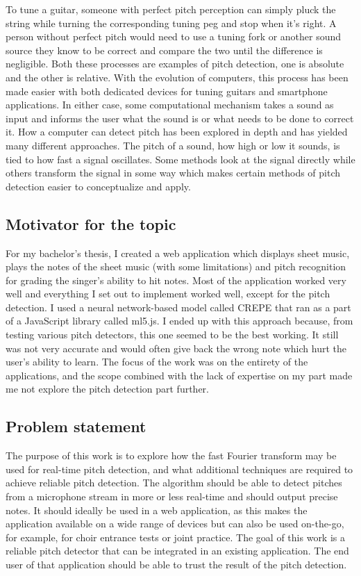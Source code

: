 To tune a guitar, someone with perfect pitch perception can simply pluck the string while turning the corresponding tuning peg and stop when it's right. A person without perfect pitch would need to use a tuning fork or another sound source they know to be correct and compare the two until the difference is negligible. Both these processes are examples of pitch detection, one is absolute and the other is relative. With the evolution of computers, this process has been made easier with both dedicated devices for tuning guitars and smartphone applications. In either case, some computational mechanism takes a sound as input and informs the user what the sound is or what needs to be done to correct it. How a computer can detect pitch has been explored in depth and has yielded many different approaches. The pitch of a sound, how high or low it sounds, is tied to how fast a signal oscillates. Some methods look at the signal directly while others transform the signal in some way which makes certain methods of pitch detection easier to conceptualize and apply.

\subsection{Motivator for the topic}
For my bachelor's thesis, I created a web application which displays sheet music, plays the notes of the sheet music (with some limitations) and pitch recognition for grading the singer's ability to hit notes. Most of the application worked very well and everything I set out to implement worked well, except for the pitch detection. I used a neural network-based model called CREPE that ran as a part of a JavaScript library called ml5.js. I ended up with this approach because, from testing various pitch detectors, this one seemed to be the best working. It still was not very accurate and would often give back the wrong note which hurt the user's ability to learn. The focus of the work was on the entirety of the applications, and the scope combined with the lack of expertise on my part made me not explore the pitch detection part further.  

\subsection{Problem statement}
The purpose of this work is to explore how the fast Fourier transform may be used for real-time pitch detection, and what additional techniques are required to achieve reliable pitch detection. The algorithm should be able to detect pitches from a microphone stream in more or less real-time and should output precise notes. It should ideally be used in a web application, as this makes the application available on a wide range of devices but can also be used on-the-go, for example, for choir entrance tests or joint practice. The goal of this work is a reliable pitch detector that can be integrated in an existing application. The end user of that application should be able to trust the result of the pitch detection. 
